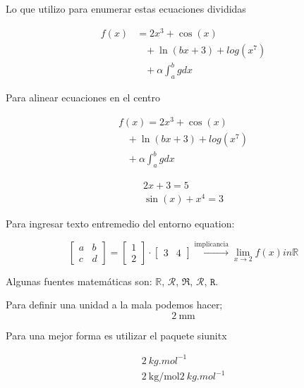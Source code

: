 \documentclass[12pt, letterpaper]{article}
\begin{document}
Lo que utilizo para enumerar estas ecuaciones divididas

\begin{equation}
    \begin{split}
        f(x) & = 2x^3+\cos(x) \\
             & \hspace{10pt} + \ln(bx+3) +log(x^7) \\ 
            & \hspace{10pt} + \alpha\int_a^b g dx 
    \end{split}
    \label{eqn:ecuacion3}
\end{equation}

Para alinear ecuaciones en el centro

\begin{gather} %
    f(x) = 2x^3+\cos(x) \\
         \hspace{10pt} + \ln(bx+3) +log(x^7) \\ 
         \hspace{10pt} + \alpha\int_a^b g dx 
\end{gather}

\begin{gather} %
    2x+3=5 \\
    \sin(x) + x^4 = 3
\end{gather}

Para ingresar texto entremedio del entorno equation:

\begin{equation}
    \begin{bmatrix}
        a & b \\
        c & d
    \end{bmatrix}
    =
    \begin{bmatrix}
        1 \\
        2
    \end{bmatrix}
    \cdot
    \begin{bmatrix}
        3 & 4
    \end{bmatrix}
    \overset{\text{implicancia}}{\rightarrow}
    \lim_{x \to 2} f(x) in \mathbb{R}
\end{equation}

Algunas fuentes matemáticas son: $\mathbb{R}$, $\mathscr{R}$, $\mathfrak{R}$, $\mathcal{R}$, $\mathtt{R}$.

\newpage

Para definir una unidad a la mala podemos hacer;
\begin{equation}
    2 \ \text{mm}
\end{equation}

Para una mejor forma es utilizar el paquete siunitx

\begin{gather}
    2 \ \unit{kg.mol^{-1}} \\
    2 \ \unit{\kilogram\per\mole}
    \qty{2}{kg.mol^{-1}}
\end{gather}
\end{document}
